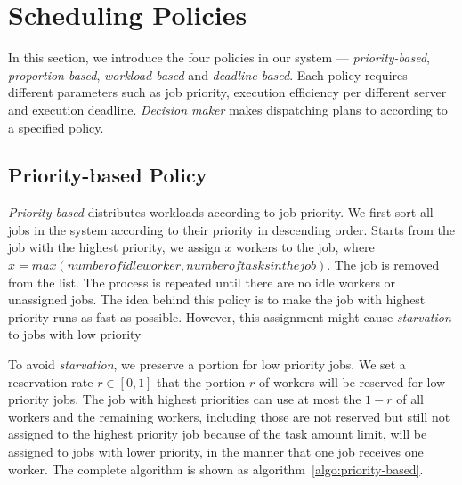 \section{Scheduling Policies}\label{sec:policy}

In this section, we introduce the four policies in our system ---
{\em priority-based}, {\em proportion-based}, {\em workload-based}
and {\em deadline-based}.
Each policy requires different parameters such as job priority,
execution efficiency per different server and execution deadline.
{\em Decision maker} makes dispatching plans to according to a specified
policy.



\subsection{Priority-based Policy}	%

{\em Priority-based} distributes workloads according to job priority. 
We first sort all jobs in the system according to their priority in 
descending order.
Starts from the job with the highest priority, we assign $x$ workers to
the job, where $x = max(number of idle worker, number of tasks in the 
job)$.
The job is removed from the list.
The process is repeated until there are no idle workers or unassigned 
jobs.
The idea behind this policy is to make the job with highest priority 
runs as fast as possible.
However, this assignment might cause {\em starvation} to jobs with 
low priority

To avoid {\em starvation}, we preserve a portion for low priority jobs.
We set a reservation rate $r \in [0,1]$ that the portion $r$ of workers
will be reserved for low priority jobs.
The job with highest priorities can use at most the $1-r$ of all workers
and the remaining workers, including those are not reserved but still not
assigned to the highest priority job because of the task amount limit,
will be assigned to jobs with lower priority, in the manner that one job
receives one worker.
The complete algorithm is shown as algorithm~\ref{algo:priority-based}.

